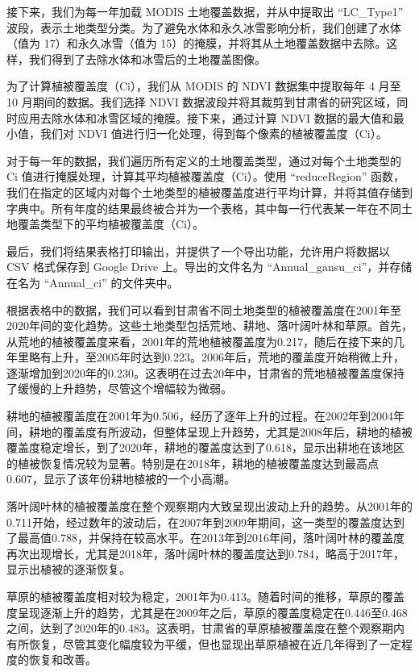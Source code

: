 \documentclass{article}
\begin{document}
		接下来，我们为每一年加载 MODIS 土地覆盖数据，并从中提取出 ``LC\_Type1'' 波段，表示土地类型分类。为了避免水体和永久冰雪影响分析，我们创建了水体（值为 17）和永久冰雪（值为 15）的掩膜，并将其从土地覆盖数据中去除。这样，我们得到了去除水体和冰雪后的土地覆盖图像。
		
		为了计算植被覆盖度（Ci），我们从 MODIS 的 NDVI 数据集中提取每年 4 月至 10 月期间的数据。我们选择 NDVI 数据波段并将其裁剪到甘肃省的研究区域，同时应用去除水体和冰雪区域的掩膜。接下来，通过计算 NDVI 数据的最大值和最小值，我们对 NDVI 值进行归一化处理，得到每个像素的植被覆盖度（Ci）。
		
		对于每一年的数据，我们遍历所有定义的土地覆盖类型，通过对每个土地类型的 Ci 值进行掩膜处理，计算其平均植被覆盖度（Ci）。使用 ``reduceRegion'' 函数，我们在指定的区域内对每个土地类型的植被覆盖度进行平均计算，并将其值存储到字典中。所有年度的结果最终被合并为一个表格，其中每一行代表某一年在不同土地覆盖类型下的平均植被覆盖度（Ci）。
		
		最后，我们将结果表格打印输出，并提供了一个导出功能，允许用户将数据以 CSV 格式保存到 Google Drive 上。导出的文件名为 ``Annual\_gansu\_ci''，并存储在名为 ``Annual\_ci'' 的文件夹中。

		根据表格中的数据，我们可以看到甘肃省不同土地类型的植被覆盖度在2001年至2020年间的变化趋势。这些土地类型包括荒地、耕地、落叶阔叶林和草原。首先，从荒地的植被覆盖度来看，2001年的荒地植被覆盖度为0.217，随后在接下来的几年里略有上升，至2005年时达到0.223。2006年后，荒地的覆盖度开始稍微上升，逐渐增加到2020年的0.230。这表明在过去20年中，甘肃省的荒地植被覆盖度保持了缓慢的上升趋势，尽管这个增幅较为微弱。
		
		耕地的植被覆盖度在2001年为0.506，经历了逐年上升的过程。在2002年到2004年间，耕地的覆盖度有所波动，但整体呈现上升趋势，尤其是2008年后，耕地的植被覆盖度稳定增长，到了2020年，耕地的覆盖度达到了0.618，显示出耕地在该地区的植被恢复情况较为显著。特别是在2018年，耕地的植被覆盖度达到最高点0.607，显示了该年份耕地植被的一个小高潮。
		
		落叶阔叶林的植被覆盖度在整个观察期内大致呈现出波动上升的趋势。从2001年的0.711开始，经过数年的波动后，在2007年到2009年期间，这一类型的覆盖度达到了最高值0.788，并保持在较高水平。在2013年到2016年间，落叶阔叶林的覆盖度再次出现增长，尤其是2018年，落叶阔叶林的覆盖度达到0.784，略高于2017年，显示出植被的逐渐恢复。
		
		草原的植被覆盖度相对较为稳定，2001年为0.413。随着时间的推移，草原的覆盖度呈现逐渐上升的趋势，尤其是在2009年之后，草原的覆盖度稳定在0.446至0.468之间，达到了2020年的0.483。这表明，甘肃省的草原植被覆盖度在整个观察期内有所恢复，尽管其变化幅度较为平缓，但也显现出草原植被在近几年得到了一定程度的恢复和改善。
		
\end{document}
